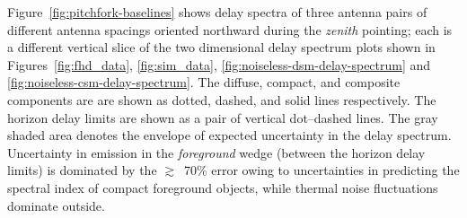 \documentclass[preprint2,iop,numberedappendix]{emulateapj}
\begin{document}
Figure~\ref{fig:pitchfork-baselines} shows delay spectra of three antenna pairs of different antenna spacings oriented northward during the {\it zenith} pointing; each is a different vertical slice of the two dimensional delay spectrum plots shown in Figures~\ref{fig:fhd_data}, \ref{fig:sim_data}, \ref{fig:noiseless-dsm-delay-spectrum} and \ref{fig:noiseless-csm-delay-spectrum}. The diffuse, compact, and composite components are are shown as dotted, dashed, and solid lines respectively. The horizon delay limits are shown as a pair of vertical dot--dashed lines. The gray shaded area denotes the envelope of expected uncertainty in the delay spectrum. Uncertainty in emission in the {\it foreground} wedge (between the horizon delay limits) is dominated by the $\gtrsim$~70\% error owing to uncertainties in predicting the spectral index of compact foreground objects, while thermal noise fluctuations dominate outside. 
\end{document}
